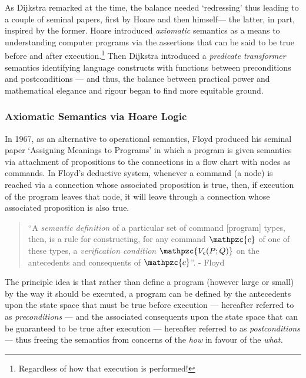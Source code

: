 \documentclass[oneside,12pt]{article}
\newcommand{\textM}[1]{\ensuremath{\mathpzc{#1}}}
\begin{document}
As Dijkstra remarked at the time, the balance needed `redressing' thus leading to a couple of seminal papers, first by Hoare\cite{hoare1969axiomatic} and then himself\cite{Dijkstra75}--- the latter, in part, inspired by the former. Hoare introduced \emph{axiomatic} semantics as a means to understanding computer programs via the assertions that can be said to be true before and after execution.\footnote{Regardless of how that execution is performed!} Then Dijkstra introduced a \emph{predicate transformer} semantics identifying language constructs with functions between preconditions and postconditions --- and thus, the balance between practical power and mathematical elegance and rigour began to find more equitable ground.



\subsubsection{Axiomatic Semantics via Hoare Logic}


In 1967, as an alternative to operational semantics, Floyd\cite{Floyd1967Flowcharts} produced his seminal paper `Assigning Meanings to Programs' in which a program is given semantics via attachment of propositions to the connections in a flow chart with nodes as commands. In Floyd's deductive system, whenever a command (a node) is reached via a connection whose associated proposition is true, then, if execution of the program leaves that node, it will leave through a connection whose associated proposition is also true.

\begin{quote}

``A \emph{semantic definition} of a particular set of command [program] types, then, is a rule for constructing, for any command \textM{c} of one of these types, a \emph{verification condition} \textM{V_c(P;Q)} on the antecedents and consequents of \textM{c}''. - \footnotesize Floyd\cite{Floyd1967Flowcharts}

\end{quote}

The principle idea is that rather than define a program (however large or small) by the way it should be executed, a program can be defined by the antecedents upon the state space that must be true before execution --- hereafter referred to as \emph{preconditions} --- and the associated consequents upon the state space that can be guaranteed to be true after execution --- hereafter referred to as \emph{postconditions} --- thus freeing the semantics from concerns of the \emph{how} in favour of the \emph{what.}
\end{document}
